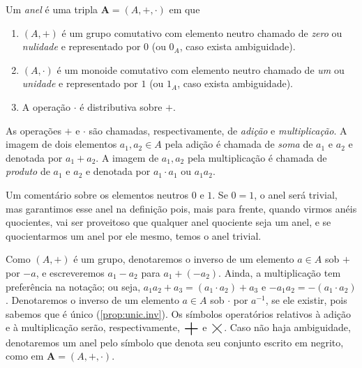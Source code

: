 \begin{defi}
	Um \emph{anel} é uma tripla $\bm A=(A,+,\cdot)$ em que
	\begin{enumerate}
	\item $(A,+)$ é um grupo comutativo com elemento neutro chamado de \emph{zero} ou \emph{nulidade} e representado por $0$ (ou $0_A$, caso exista ambiguidade).
	\item $(A,\cdot)$ é um monoide comutativo com elemento neutro chamado de \emph{um} ou \emph{unidade} e representado por $1$ (ou $1_A$, caso exista ambiguidade).
	\item A operação $\cdot$ é distributiva sobre $+$.
	\end{enumerate}
As operações $+$ e $\cdot$ são chamadas, respectivamente, de \emph{adição} e \emph{multiplicação}. A imagem de dois elementos $a_1,a_2 \in A$ pela adição é chamada de \emph{soma} de $a_1$ e $a_2$ e denotada por $a_1+a_2$. A imagem de $a_1,a_2$ pela multiplicação é chamada de \emph{produto} de $a_1$ e $a_2$ e denotada por $a_1 \cdot a_1$ ou $a_1a_2$.
\end{defi}

	Um comentário sobre os elementos neutros $0$ e $1$. Se $0=1$, o anel será trivial, mas garantimos esse anel na definição pois, mais para frente, quando virmos anéis quocientes, vai ser proveitoso que qualquer anel quociente seja um anel, e se quocientarmos um anel por ele mesmo, temos o anel trivial.

\begin{nota}
	Como $(A,+)$ é um grupo, denotaremos o inverso de um elemento $a \in A$ sob $+$ por $-a$, e escreveremos $a_1 - a_2$ para $a_1 + (-a_2)$. Ainda, a multiplicação tem preferência na notação; ou seja, $a_1a_2+a_3 = (a_1 \cdot a_2)+a_3$ e $-a_1a_2 = -(a_1 \cdot a_2)$. Denotaremos o inverso de um elemento $a \in A$ sob $\cdot$ por $a^{-1}$, se ele existir, pois sabemos que é único (\ref{prop:unic.inv}). Os símbolos operatórios relativos à adição e à multiplicação serão, respectivamente, $\bigsum$ e $\bigtimes$. Caso não haja ambiguidade, denotaremos um anel pelo símbolo que denota seu conjunto escrito em negrito, como em $\bm A=(A,+,\cdot)$.
\end{nota}


